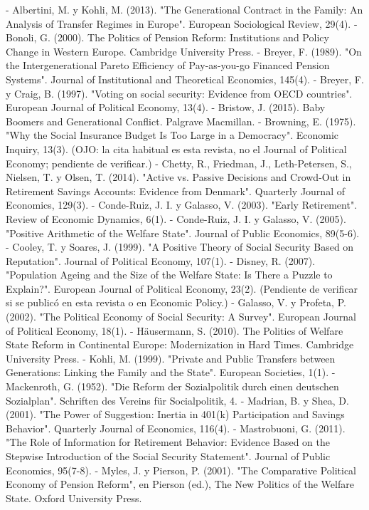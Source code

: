 \documentclass[10pt,a4paper]{article}
\begin{document}
- Albertini, M. y Kohli, M. (2013). "The Generational Contract in the Family: An Analysis of Transfer Regimes in Europe". European Sociological Review, 29(4).
- Bonoli, G. (2000). The Politics of Pension Reform: Institutions and Policy Change in Western Europe. Cambridge University Press.
- Breyer, F. (1989). "On the Intergenerational Pareto Efficiency of Pay-as-you-go Financed Pension Systems". Journal of Institutional and Theoretical Economics, 145(4).
- Breyer, F. y Craig, B. (1997). "Voting on social security: Evidence from OECD countries". European Journal of Political Economy, 13(4).
- Bristow, J. (2015). Baby Boomers and Generational Conflict. Palgrave Macmillan.
- Browning, E. (1975). "Why the Social Insurance Budget Is Too Large in a Democracy". Economic Inquiry, 13(3). (OJO: la cita habitual es esta revista, no el Journal of Political Economy; pendiente de verificar.)
- Chetty, R., Friedman, J., Leth-Petersen, S., Nielsen, T. y Olsen, T. (2014). "Active vs. Passive Decisions and Crowd-Out in Retirement Savings Accounts: Evidence from Denmark". Quarterly Journal of Economics, 129(3).
- Conde-Ruiz, J. I. y Galasso, V. (2003). "Early Retirement". Review of Economic Dynamics, 6(1).
- Conde-Ruiz, J. I. y Galasso, V. (2005). "Positive Arithmetic of the Welfare State". Journal of Public Economics, 89(5-6).
- Cooley, T. y Soares, J. (1999). "A Positive Theory of Social Security Based on Reputation". Journal of Political Economy, 107(1).
- Disney, R. (2007). "Population Ageing and the Size of the Welfare State: Is There a Puzzle to Explain?". European Journal of Political Economy, 23(2). (Pendiente de verificar si se publicó en esta revista o en Economic Policy.)
- Galasso, V. y Profeta, P. (2002). "The Political Economy of Social Security: A Survey". European Journal of Political Economy, 18(1).
- Häusermann, S. (2010). The Politics of Welfare State Reform in Continental Europe: Modernization in Hard Times. Cambridge University Press.
- Kohli, M. (1999). "Private and Public Transfers between Generations: Linking the Family and the State". European Societies, 1(1).
- Mackenroth, G. (1952). "Die Reform der Sozialpolitik durch einen deutschen Sozialplan". Schriften des Vereins für Socialpolitik, 4.
- Madrian, B. y Shea, D. (2001). "The Power of Suggestion: Inertia in 401(k) Participation and Savings Behavior". Quarterly Journal of Economics, 116(4).
- Mastrobuoni, G. (2011). "The Role of Information for Retirement Behavior: Evidence Based on the Stepwise Introduction of the Social Security Statement". Journal of Public Economics, 95(7-8).
- Myles, J. y Pierson, P. (2001). "The Comparative Political Economy of Pension Reform", en Pierson (ed.), The New Politics of the Welfare State. Oxford University Press.
\end{document}

